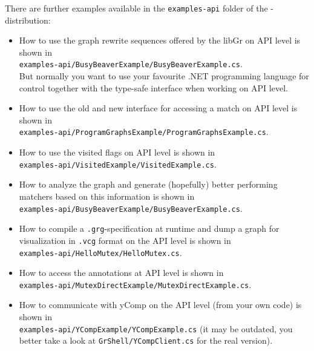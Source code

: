 There are further examples available in the \texttt{examples-api} folder of the \GrG-distribution:
\begin{itemize} 
\item How to use the graph rewrite sequences offered by the libGr on API level is shown in\\
\texttt{examples-api/BusyBeaverExample/BusyBeaverExample.cs}.\\
But normally you want to use your favourite .NET programming language for control together with the type-safe interface when working on API level.
\item How to use the old and new interface for accessing a match on API level is shown in\\
\texttt{examples-api/ProgramGraphsExample/ProgramGraphsExample.cs}.
\item How to use the visited\label{apiallocvisitflag} flags on API level is shown in\\
\texttt{examples-api/VisitedExample/VisitedExample.cs}.
\item How to analyze the graph and generate (hopefully) better performing matchers based on this information is shown in\\
\texttt{examples-api/BusyBeaverExample/BusyBeaverExample.cs}.
\item How to compile a \texttt{.grg}-specification at runtime and dump a graph for visualization in \texttt{.vcg} format on the API level is shown in\\
\texttt{examples-api/HelloMutex/HelloMutex.cs}.
\item How to access the annotations at API level is shown in\\
\texttt{examples-api/MutexDirectExample/MutexDirectExample.cs}.
\item How to communicate with yComp on the API level (from your own code) is shown in\\
\texttt{examples-api/YCompExample/YCompExample.cs} (it may be outdated, you better take a look at \texttt{GrShell/YCompClient.cs} for the real version).
\end{itemize}

